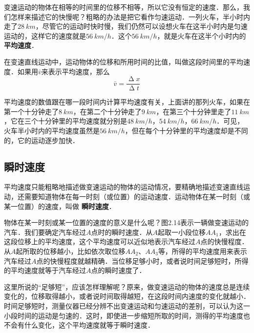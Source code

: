 变速运动的物体在相等的时间里的位移不相等，所以它没有恒定的速度．那么，我们怎样来描述它的快慢呢？粗略的办法是把它看作匀速运动．一列火车，半小时内走了$\qty{28}{km}$，尽管它的运动时快时慢，我们仍然可以设想火车在这半小时内是匀速运动的，这样它的速度就是$\qty{56}{km/h}$．这个$\qty{56}{km/h}$，就是火车在这半个小时内的\textbf{ 平均速度}．

在变速直线运动中，运动物体的位移和所用时间的比值，叫做这段时间里的平均速度．如果用$\bar v$来表示平均速度，那么
\begin{equation}
    \bar v=\frac{\upDelta x}{\upDelta t}
\end{equation}

平均速度的数值跟在哪一段时间内计算平均速度有关，上面讲的那列火车，如果在第一个十分钟走了$\qty{8}{km}$，在第二个十分钟走了$\qty{9}{km}$，在第三个十分钟里走了$\qty{11}{km}$，它在三个十分钟里的平均速度就分别是$\qty{48}{km/h}$，$\qty{54}{km/h}$，$\qty{66}{km/h}$．可见，火车半小时内的平均速度虽然是$\qty{56}{km/h}$，但在每个十分钟里的平均速度却是不同的，它的运动逐步加快．

\subsection{瞬时速度}

平均速度只能粗略地描述做变速运动的物体的运动情况，要精确地描述变速直线运动，还需要知道物体在每一时刻（或位置）的运动速度．运动物体在某一时刻（或某一位置）的速度，叫做\textbf{ 瞬时速度}．

物体在某一时刻或某一位置的速度的意义是什么呢？图2.14表示一辆做变速运动的汽车．我们要确定汽车经过$A$点时的瞬时速度．从$A$起取一小段位移$AA_1$，求出在这段位移上的平均速度，这个平均速度可以近似地表示汽车经过$A$点的快慢程度．从$A$起所取的位移越小，比如依次取位移$AA_2$、$AA_3$等，所得的平均速度用来表示汽车经过$A$点的快慢程度就越精确．当位移足够小时，或者说时间足够短时，所得的平均速度就等于汽车经过$A$点的瞬时速度了．

这里所说的“足够短”，应该怎样理解呢？原来，做变速运动的物体的速度总是连续变化的，位移取得越小，或者说时间取得越短，在这段时间内速度的变化就越小．时间足够短时，测量仪器已经分辨不出变速运动和匀速运动的差别，可以认为这一小段时间的运动是匀速的．这时，即使进一步缩短所取的时间，测得的平均速度也不会有什么变化，这个平均速度就等于瞬时速度．

